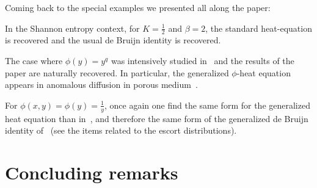 \documentclass[entropy,article,submit,moreauthors,pdftex]{Definitions/mdpi}
\newcounter{GaussExample}%
\newcounter{qGaussExample}%
\newcounter{arcsineExample}%
\begin{document}
Coming back to the special examples we presented all along the paper:
%
\begin{Example}
  In  the Shannon  entropy context,  for  $K =  \frac12$  and $\beta  = 2$,  the
  standard  heat-equation is  recovered  and  the usual  de  Bruijn identity  is
  recovered.
\end{Example}
%
\begin{Example}
  The case where $\phi(y) =  y^q$ was intensively studied in~\cite{Ber13:08} and
  the  results  of  the  paper  are naturally  recovered.   In  particular,  the
  generalized  $\phi$-heat equation  appears  in anomalous  diffusion in  porous
  medium~\cite{TsaLen02, Ber13:08, Vaz06, GilKer04, Rou05}.
\end{Example}
%
\begin{Example}
  For $\phi(x,y) = \phi(y) = \frac{1}{y}$, once again one find the same form for
  the generalized  heat equation  than in~\cite{TsaLen02, Ber13:08,  Vaz06}, and
  therefore   the   same   form   of  the   generalized   de   Bruijn   identity
  of~\cite{Ber13:08} (see the items related to the escort distributions).
\end{Example}





\section{Concluding remarks}
\label{sec:Conclusion}
\end{document}
